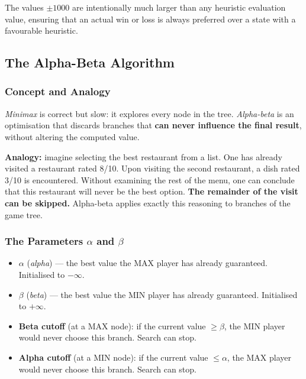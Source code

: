 The values $\pm1000$ are intentionally much larger than any
heuristic evaluation value, ensuring that an actual win or loss
is always preferred over a state with a favourable heuristic.

\subsection{The Alpha-Beta Algorithm}
\label{subsec:alphabeta}

\subsubsection{Concept and Analogy}

\textit{Minimax} is correct but slow: it explores every node in the tree.
\textit{Alpha-beta} is an optimisation that discards branches that
\textbf{can never influence the final result}, without altering the
computed value.

\textbf{Analogy:} imagine selecting the best restaurant from a list.
One has already visited a restaurant rated 8/10. Upon visiting the
second restaurant, a dish rated 3/10 is encountered. Without examining
the rest of the menu, one can conclude that this restaurant will never be
the best option. \textbf{The remainder of the visit can be skipped.}
Alpha-beta applies exactly this reasoning to branches of the game tree.

\subsubsection{The Parameters $\alpha$ and $\beta$}

\begin{itemize}
  \item $\alpha$ (\textit{alpha}) --- the best value the MAX player
        has already guaranteed. Initialised to $-\infty$.
  \item $\beta$ (\textit{beta}) --- the best value the MIN player
        has already guaranteed. Initialised to $+\infty$.
  \item \textbf{Beta cutoff} (at a MAX node): if the current value $\geq \beta$,
        the MIN player would never choose this branch. Search can stop.
  \item \textbf{Alpha cutoff} (at a MIN node): if the current value $\leq \alpha$,
        the MAX player would never choose this branch. Search can stop.
\end{itemize}


